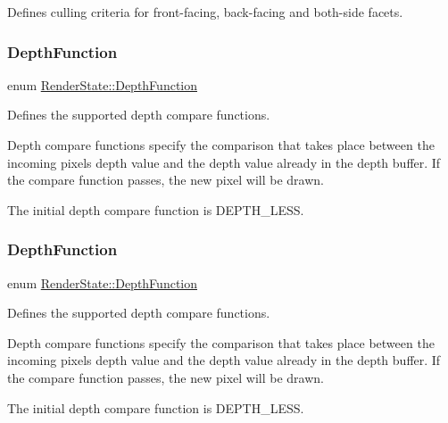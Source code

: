 Defines culling criteria for front-\/facing, back-\/facing and both-\/side facets. \mbox{\label{classRenderState_a36d3d228500feb75244c2c761c42b231}} 
\subsubsection{\texorpdfstring{Depth\+Function}{DepthFunction}\hspace{0.1cm}{\footnotesize\ttfamily [1/2]}}
{\footnotesize\ttfamily enum \hyperlink{classRenderState_a36d3d228500feb75244c2c761c42b231}{Render\+State\+::\+Depth\+Function}}

Defines the supported depth compare functions.

Depth compare functions specify the comparison that takes place between the incoming pixel\textquotesingle{}s depth value and the depth value already in the depth buffer. If the compare function passes, the new pixel will be drawn.

The initial depth compare function is D\+E\+P\+T\+H\+\_\+\+L\+E\+SS. \mbox{\label{classRenderState_a36d3d228500feb75244c2c761c42b231}} 
\subsubsection{\texorpdfstring{Depth\+Function}{DepthFunction}\hspace{0.1cm}{\footnotesize\ttfamily [2/2]}}
{\footnotesize\ttfamily enum \hyperlink{classRenderState_a36d3d228500feb75244c2c761c42b231}{Render\+State\+::\+Depth\+Function}}

Defines the supported depth compare functions.

Depth compare functions specify the comparison that takes place between the incoming pixel\textquotesingle{}s depth value and the depth value already in the depth buffer. If the compare function passes, the new pixel will be drawn.

The initial depth compare function is D\+E\+P\+T\+H\+\_\+\+L\+E\+SS. \mbox{\label{classRenderState_ac748310042b020a92ea97ede898be30e}} 
